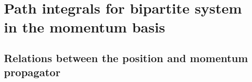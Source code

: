 \chapter{Path integrals for bipartite system in the momentum basis}
\label{sec:perturbation_series_momentum}

\section{Relations between the position and momentum propagator}